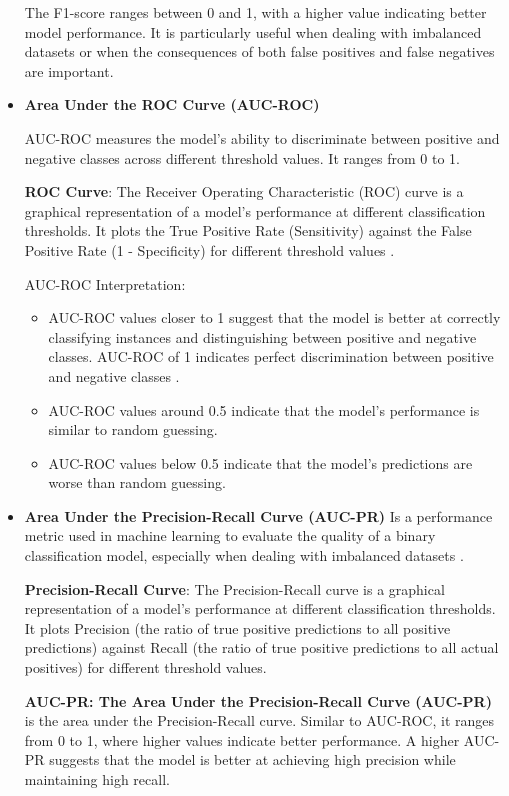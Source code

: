 \begin{itemize}
The F1-score ranges between 0 and 1, with a higher value indicating better model performance. It is particularly useful when dealing with imbalanced datasets or when the consequences of both false positives and false negatives are important.

\item \textbf{Area Under the ROC Curve (AUC-ROC)}

AUC-ROC measures the model's ability to discriminate between positive and negative classes across different threshold values. It ranges from 0 to 1.

\textbf{ROC Curve}: The Receiver Operating Characteristic (ROC) curve is a graphical representation of a model's performance at different classification thresholds. It plots the True Positive Rate (Sensitivity) against the False Positive Rate (1 - Specificity) for different threshold values \cite{Somogyi2021}.

AUC-ROC Interpretation:

\begin{itemize}
\item AUC-ROC values closer to 1 suggest that the model is better at correctly classifying instances and distinguishing between positive and negative classes. AUC-ROC of 1 indicates perfect discrimination between positive and negative classes \cite{Somogyi2021}.
\item AUC-ROC values around 0.5 indicate that the model's performance is similar to random guessing.
\item AUC-ROC values below 0.5 indicate that the model's predictions are worse than random guessing.
\end{itemize}

\item \textbf{Area Under the Precision-Recall Curve (AUC-PR)}
Is a performance metric used in machine learning to evaluate the quality of a binary classification model, especially when dealing with imbalanced datasets \cite{Somogyi2021}.


\textbf{Precision-Recall Curve}: The Precision-Recall curve is a graphical representation of a model's performance at different classification thresholds. It plots Precision (the ratio of true positive predictions to all positive predictions) against Recall (the ratio of true positive predictions to all actual positives) for different threshold values.

\textbf{AUC-PR: The Area Under the Precision-Recall Curve (AUC-PR)} is the area under the Precision-Recall curve. Similar to AUC-ROC, it ranges from 0 to 1, where higher values indicate better performance. A higher AUC-PR suggests that the model is better at achieving high precision while maintaining high recall.


\end{itemize}
